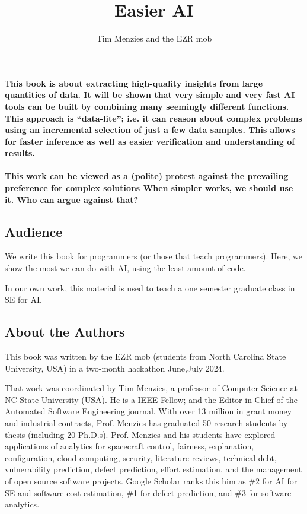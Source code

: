\documentclass[landscape,	DIV=calc,%
							paper=letter,%
							fontsize=10pt,%
							twocolumn]{scrartcl}	 					%
\title{Easier AI }					%
\author{Tim Menzies and the EZR mob }											%
\date{}
\newcommand{\initial}[1]{%
     \lettrine[lines=3,lhang=0.3,nindent=0em]{
     				\color{DarkGoldenrod}
     				{\textsf{#1}}}{}}
\begin{document}
\maketitle
\vspace{-20px}
\thispagestyle{fancy} 			%
\initial{T}\textbf{his book
is about
extracting high-quality  insights from large quantities
of data. 
It will be shown that very simple and very fast    
AI tools can  be built by combining
many seemingly different functions.
This approach is  ``data-lite''; i.e. it  can reason about
complex problems using an incremental selection of just a few data samples.
This 
allows for faster inference as well as
easier verification and understanding of results. \\~\\ 
This  work can be viewed as a (polite) protest
against  the prevailing preference for complex solutions
When simpler works, we should use it.
Who can argue against that?}

\subsection*{Audience}
We write this book for programmers (or those that teach programmers).
Here, we show
the most we  can do with AI, using the least amount of code.

In our own work, this material is used to teach a one semester graduate
class in SE for AI.

\newpage
\subsection*{About the Authors}
This book was written by the EZR mob (students from North Carolina State University, USA)
in a two-month hackathon June,July 2024. 

That work was coordinated  by 
Tim Menzies, a professor of Computer Science at NC State University (USA).
He is a 
IEEE Fellow; and the Editor-in-Chief of the
Automated Software Engineering journal.
With over 13 million in grant money and industrial contracts,
Prof. Menzies  has graduated 50 research students-by-thesis (including 20
Ph.D.s).  Prof. Menzies and his students have explored
applications of analytics for
spacecraft control, fairness, explanation, configuration, cloud computing,  security, literature reviews,
technical  debt,  vulnerability prediction, defect prediction, effort estimation,  and the management
of open source software projects.
Google Scholar ranks this him as \#2 for AI for SE and
software cost estimation, \#1 for defect prediction, and \#3 for software
analytics.  
\end{document}
